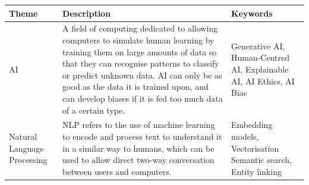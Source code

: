 \documentclass[12pt]{report}
\begin{document}
\pagebreak
    \begin{table}[H]
        \centering
        \begin{tabular}{|p{}|p{} | p{}|}
            \hline
            \cellcolor{blue!25}Theme & \cellcolor{blue!25}Description &
            \cellcolor{blue!25}Keywords \\

            \hline

            AI & A field of computing dedicated to allowing computers to simulate human
            learning by training them on large amounts of data so that they can recognise patterns to classify or 
            predict unknown data. AI can only be as good as the data it is trained upon, and can 
            develop biases if it is fed too much data of a certain type. & Generative AI, 
            Human-Centred AI, Explainable AI, AI Ethics, AI Bias \\



            \hline

            Natural Language Processing & NLP refers to the use of machine learning to encode and 
            process text to understand it in a similar way to humans, which can be used to allow direct 
            two-way conversation between users and computers. & Embedding models, Vectorisation
            Semantic search, Entity linking


\end{tabular}
\end{table}
\end{document}
